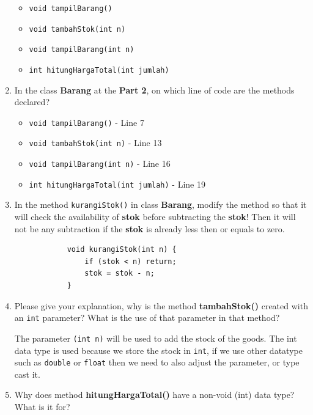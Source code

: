 \documentclass[12pt,titlepage]{article}
\begin{document}
\begin{enumerate}
{        \begin{itemize}
            \item \texttt{void tampilBarang()}
            \item \texttt{void tambahStok(int n)}
            \item \texttt{void tampilBarang(int n)}
            \item \texttt{int hitungHargaTotal(int jumlah)}
        \end{itemize}
    }
    \newpage
    \item {
        In the class \textbf{Barang} at the \textbf{Part 2}, on which line of code are the methods declared?

        \begin{itemize}
            \item \texttt{void tampilBarang()} - Line 7
            \item \texttt{void tambahStok(int n)} - Line 13
            \item \texttt{void tampilBarang(int n)} - Line 16
            \item \texttt{int hitungHargaTotal(int jumlah)} - Line 19
        \end{itemize}
    }
    \item {
        In the method \texttt{kurangiStok()} in class \textbf{Barang}, modify the method so that it will check the availability of \textbf{stok} before subtracting the \textbf{stok}!
        Then it will not be any subtraction if the \textbf{stok} is already less then or equals to zero.

        \begin{verbatim}
            void kurangiStok(int n) {
                if (stok < n) return;
                stok = stok - n;
            }
        \end{verbatim}
    }
    \item {
        Please give your explanation, why is the method \textbf{tambahStok()} created with an \texttt{int} parameter?
        What is the use of that parameter in that method?

        The parameter \texttt{(int n)} will be used to add the stock of the goods.
        The int data type is used because we store the stock in \texttt{int},
        if we use other datatype such as \texttt{double} or \texttt{float} then we need to also adjust the parameter, or type cast it. 
    }
    \item {
        Why does method \textbf{hitungHargaTotal()} have a non-void (int) data type? What is it for?

}
\end{enumerate}
\end{document}
